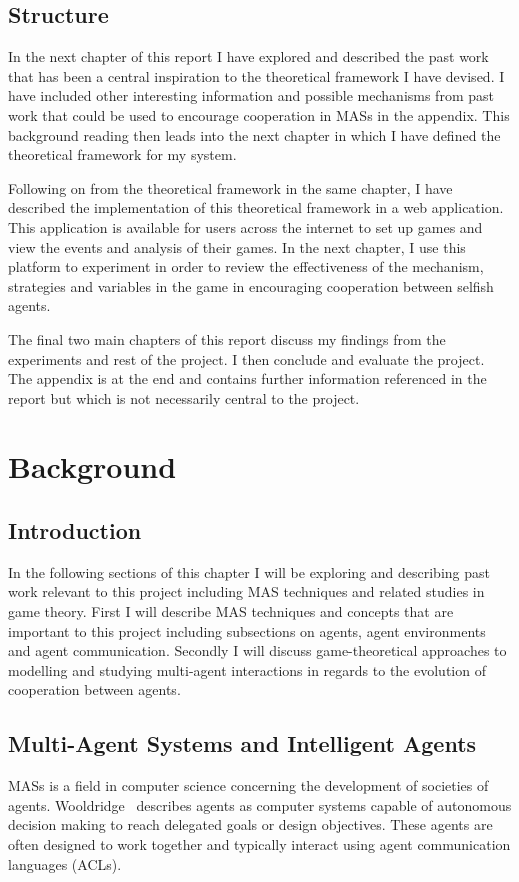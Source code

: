 \documentclass[]{final_report}
\begin{document}
\section{Structure}
In the next chapter of this report I have explored and described the past work that has been a central inspiration to the theoretical framework I have devised. I have included other interesting information and possible mechanisms from past work that could be used to encourage cooperation in MASs in the appendix. This background reading then leads into the next chapter in which I have defined the theoretical framework for my system.\par
Following on from the theoretical framework in the same chapter, I have described the implementation of this theoretical framework in a web application. This application is available for users across the internet to set up games and view the events and analysis of their games. In the next chapter, I use this platform to experiment in order to review the effectiveness of the mechanism, strategies and variables in the game in encouraging cooperation between selfish agents.\par
The final two main chapters of this report discuss my findings from the experiments and rest of the project. I then conclude and evaluate the project. The appendix is at the end and contains further information referenced in the report but which is not necessarily central to the project.

\chapter{Background}

\section{Introduction}
In the following sections of this chapter I will be exploring and describing past work relevant to this project including MAS techniques and related studies in game theory. First I will describe MAS techniques and concepts that are important to this project including subsections on agents, agent environments and agent communication. Secondly I will discuss game-theoretical approaches to modelling and studying multi-agent interactions in regards to the evolution of cooperation between agents.

\section{Multi-Agent Systems and Intelligent Agents}
\label{sec:backgroundmas}
MASs is a field in computer science concerning the development of societies of agents. Wooldridge~\cite{wooldridge2009introduction} describes agents as computer systems capable of autonomous decision making to reach delegated goals or design objectives. These agents are often designed to work together and typically interact using agent communication languages (ACLs).\par 
\end{document}
